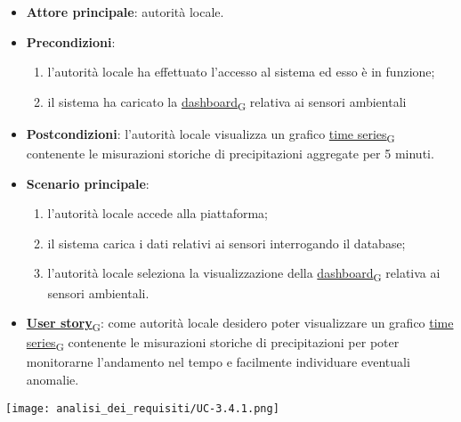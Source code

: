 \newpage
{}
\begin{itemize}
	\item \textbf{Attore principale}: autorità locale.
	\item \textbf{Precondizioni}:
	      \begin{enumerate}
		      \item l'autorità locale ha effettuato l'accesso al sistema ed esso è in funzione;
		      \item il sistema ha caricato la \href{https://7last.github.io/docs/pb/documentazione-interna/glossario\#dashboard}{dashboard\textsubscript{G}} relativa ai sensori ambientali
	      \end{enumerate}
	\item \textbf{Postcondizioni}: l'autorità locale visualizza un grafico \href{https://7last.github.io/docs/pb/documentazione-interna/glossario\#time-series}{time series\textsubscript{G}} contenente le misurazioni storiche
	      di precipitazioni aggregate per 5 minuti.
	\item \textbf{Scenario principale}:
	      \begin{enumerate}
		      \item l'autorità locale accede alla piattaforma;
		      \item il sistema carica i dati relativi ai sensori interrogando il database;
		      \item l'autorità locale seleziona la visualizzazione della \href{https://7last.github.io/docs/pb/documentazione-interna/glossario\#dashboard}{dashboard\textsubscript{G}} relativa ai sensori ambientali.
	      \end{enumerate}
	\item \href{https://7last.github.io/docs/pb/documentazione-interna/glossario\#user-story}{\textbf{User story}\textsubscript{G}}:
	      come autorità locale desidero poter visualizzare un grafico \href{https://7last.github.io/docs/pb/documentazione-interna/glossario\#time-series}{time series\textsubscript{G}} contenente le misurazioni storiche
	      di precipitazioni per poter monitorarne l'andamento nel tempo e facilmente individuare eventuali anomalie.
\end{itemize}
\begin{center}
	\texttt{[image: analisi\_dei\_requisiti/UC-3.4.1.png]}
\end{center}

